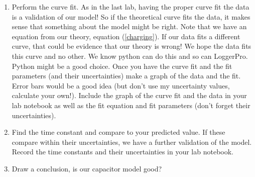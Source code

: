 \begin{enumerate}
	\item Perform the curve fit. As in the last lab, having the proper curve fit the data is a validation of our model! So if the theoretical curve fits the data, it makes sense that something about the model might be right. Note that we have an equation from our theory, equation (\ref{charging}). If our data fits a different curve, that could be evidence that our theory is wrong! We hope the data fits this curve and no other. We know python can do this and so can LoggerPro.  Python might be a good choice.  Once you have the curve fit and the fit parameters (and their uncertainties) make a graph of the data and the fit. Error bars would be a good idea (but don't use my uncertainty values, calculate your own!). Include the graph of the curve fit and the data in your lab notebook as well as the fit equation and fit parameters (don't forget their uncertainties).

	\item Find the time constant and compare to your predicted value. If these compare within their uncertainties, we have a further validation of the model. Record the time constants and their uncertainties in your lab notebook.

	\item Draw a conclusion, is our capacitor model good?
\end{enumerate}


\vspace*{\fill}
